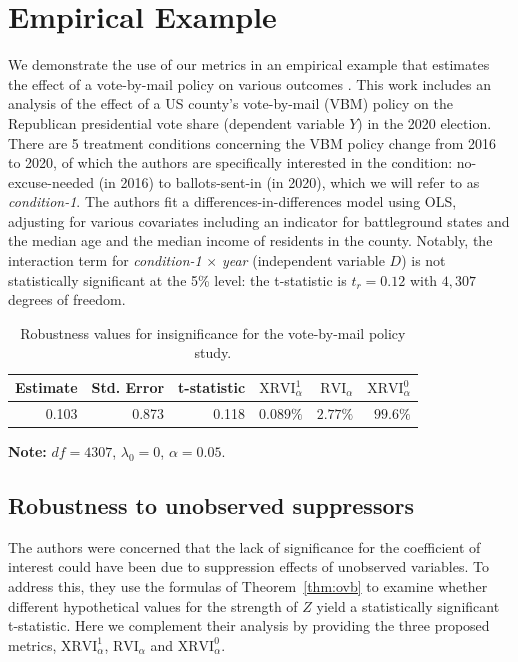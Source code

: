 \documentclass[sts]{imsart}
\theoremstyle{plain}
\theoremstyle{definition}
\newcommand{\df}{df}
\newcommand{\XRVI}{\text{XRVI}}
\newcommand{\RVI}{\text{RVI}}
\begin{document}
\section{Empirical Example}\label{sec:empirical_example}
We demonstrate the use of our metrics in an empirical example that estimates the effect of a vote-by-mail policy on various outcomes \citep{amlani2022impact}. This work includes an analysis of the effect of a US county's vote-by-mail (VBM) policy  on the Republican presidential vote share (dependent variable $Y$) in the 2020 election. There are 5 treatment conditions concerning the VBM policy change from 2016 to 2020, of which the authors are specifically interested in the condition: no-excuse-needed (in 2016) to ballots-sent-in (in 2020), which we will refer to as \emph{condition-1}. The authors fit a differences-in-differences model using OLS, adjusting for various covariates including an indicator for battleground states and the median age and the median income of residents in the county. Notably, the interaction term for \emph{condition-1} $\times$ \emph{year} (independent variable $D$) is not statistically significant at the 5\% level: the t-statistic is $t_{r}=0.12$ with $4,307$ degrees of freedom. 

\begin{table}[t]
    \centering
    \begin{tabular}{rrrrrr}\toprule 
        Estimate & Std. Error & t-statistic & ${\XRVI^{1}_{\alpha}}$  &${\RVI_{\alpha}}$  &${\XRVI^{0}_{\alpha}}$ \\\midrule
        0.103 & 0.873 & 0.118 & $0.089\%$  & $2.77\%$  & $99.6\%$ \\ \bottomrule 
    \end{tabular}
    \smallskip
    {\raggedright\textbf{Note:} $\df = 4307$, $\lambda_0 = 0$, $\alpha = 0.05$. \hfill }
    \caption{Robustness values for insignificance for the vote-by-mail policy study.}
    \label{tab:amlani}
\end{table}

\subsection{Robustness to unobserved suppressors} The authors were concerned that the lack of significance for the coefficient of interest could have been due to suppression effects of unobserved variables. To address this, they use the formulas of Theorem~\ref{thm:ovb} to examine whether different hypothetical values for the strength of $Z$ yield a statistically significant t-statistic. Here we complement their analysis by providing the three proposed metrics, $\XRVI^1_\alpha$, $\RVI_\alpha$ and $\XRVI^0_\alpha$. 
\end{document}
